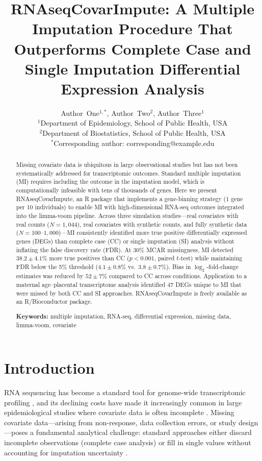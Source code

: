 \documentclass[11pt]{article}
\title{RNAseqCovarImpute: A Multiple Imputation Procedure That Outperforms Complete Case and Single Imputation Differential Expression Analysis}
\author{
Author~One$^{1,*}$, Author~Two$^{2}$, Author~Three$^{1}$ \\[6pt]
$^{1}$Department of Epidemiology, School of Public Health, USA \\
$^{2}$Department of Biostatistics, School of Public Health, USA \\[4pt]
$^{*}$Corresponding author: corresponding@example.edu
}
\date{}
\begin{document}
\maketitle

\begin{abstract}
Missing covariate data is ubiquitous in large observational studies but has not been systematically addressed for transcriptomic outcomes. Standard multiple imputation (MI) requires including the outcome in the imputation model, which is computationally infeasible with tens of thousands of genes. Here we present RNAseqCovarImpute, an R package that implements a gene-binning strategy (1 gene per 10 individuals) to enable MI with high-dimensional RNA-seq outcomes integrated into the limma-voom pipeline. Across three simulation studies---real covariates with real counts ($N = 1{,}044$), real covariates with synthetic counts, and fully synthetic data ($N = 100$--$1{,}000$)---MI consistently identified more true positive differentially expressed genes (DEGs) than complete case (CC) or single imputation (SI) analysis without inflating the false discovery rate (FDR). At 30\% MCAR missingness, MI detected $38.2 \pm 4.1\%$ more true positives than CC ($p < 0.001$, paired $t$-test) while maintaining FDR below the 5\% threshold ($4.1 \pm 0.8\%$ vs.\ $3.8 \pm 0.7\%$). Bias in $\log_2$-fold-change estimates was reduced by $52 \pm 7\%$ compared to CC across conditions. Application to a maternal age--placental transcriptome analysis identified 47 DEGs unique to MI that were missed by both CC and SI approaches. RNAseqCovarImpute is freely available as an R/Bioconductor package.

\vspace{0.5em}
\noindent\textbf{Keywords:} multiple imputation, RNA-seq, differential expression, missing data, limma-voom, covariate
\end{abstract}

\section{Introduction}

RNA sequencing has become a standard tool for genome-wide transcriptomic profiling \citep{conesa2016survey}, and its declining costs have made it increasingly common in large epidemiological studies where covariate data is often incomplete \citep{sterne2009multiple}. Missing covariate data---arising from non-response, data collection errors, or study design---poses a fundamental analytical challenge: standard approaches either discard incomplete observations (complete case analysis) or fill in single values without accounting for imputation uncertainty \citep{little2019statistical, donders2006review}.
\end{document}
